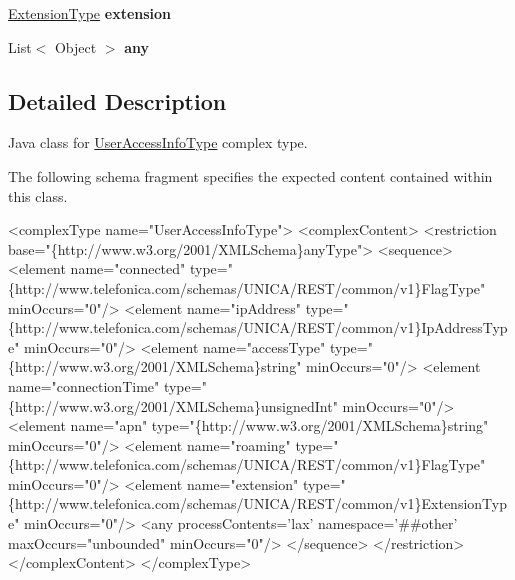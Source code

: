 \begin{DoxyCompactItemize}
\item 
\hypertarget{classcom_1_1telefonica_1_1schemas_1_1unica_1_1rest_1_1directory_1_1v1_1_1UserAccessInfoType_a45c2486b4cd1a2507277f519d38ec8b9}{
\hyperlink{classcom_1_1telefonica_1_1schemas_1_1unica_1_1rest_1_1common_1_1v1_1_1ExtensionType}{ExtensionType} {\bfseries extension}}
\label{classcom_1_1telefonica_1_1schemas_1_1unica_1_1rest_1_1directory_1_1v1_1_1UserAccessInfoType_a45c2486b4cd1a2507277f519d38ec8b9}

\item 
\hypertarget{classcom_1_1telefonica_1_1schemas_1_1unica_1_1rest_1_1directory_1_1v1_1_1UserAccessInfoType_ae57f76efd5dd098004134c73e35c0cc4}{
List$<$ Object $>$ {\bfseries any}}
\label{classcom_1_1telefonica_1_1schemas_1_1unica_1_1rest_1_1directory_1_1v1_1_1UserAccessInfoType_ae57f76efd5dd098004134c73e35c0cc4}

\end{DoxyCompactItemize}


\subsection{Detailed Description}
Java class for \hyperlink{classcom_1_1telefonica_1_1schemas_1_1unica_1_1rest_1_1directory_1_1v1_1_1UserAccessInfoType}{UserAccessInfoType} complex type.

The following schema fragment specifies the expected content contained within this class.


\begin{DoxyPre}
 <complexType name="UserAccessInfoType">
   <complexContent>
     <restriction base="\{http://www.w3.org/2001/XMLSchema\}anyType">
       <sequence>
         <element name="connected" type="\{http://www.telefonica.com/schemas/UNICA/REST/common/v1\}FlagType" minOccurs="0"/>
         <element name="ipAddress" type="\{http://www.telefonica.com/schemas/UNICA/REST/common/v1\}IpAddressType" minOccurs="0"/>
         <element name="accessType" type="\{http://www.w3.org/2001/XMLSchema\}string" minOccurs="0"/>
         <element name="connectionTime" type="\{http://www.w3.org/2001/XMLSchema\}unsignedInt" minOccurs="0"/>
         <element name="apn" type="\{http://www.w3.org/2001/XMLSchema\}string" minOccurs="0"/>
         <element name="roaming" type="\{http://www.telefonica.com/schemas/UNICA/REST/common/v1\}FlagType" minOccurs="0"/>
         <element name="extension" type="\{http://www.telefonica.com/schemas/UNICA/REST/common/v1\}ExtensionType" minOccurs="0"/>
         <any processContents='lax' namespace='\##other' maxOccurs="unbounded" minOccurs="0"/>
       </sequence>
     </restriction>
   </complexContent>
 </complexType>
 \end{DoxyPre}
 

